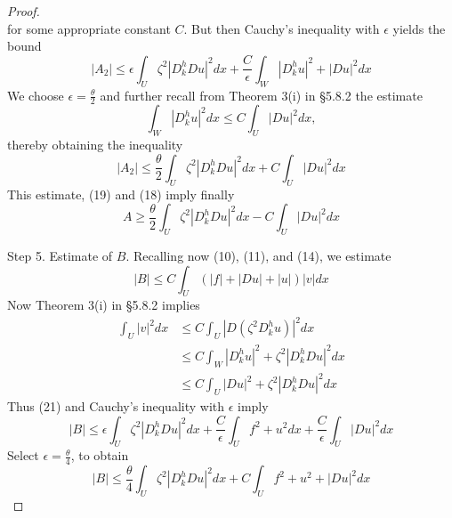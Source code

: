 \begin{theorem}
\begin{proof}
\begin{equation*}
        \end{equation*}
        for some appropriate constant $C$. But then Cauchy's inequality with $\epsilon$  yields the bound
        \begin{equation*}
            \left|A_2\right|
            \leq
            \epsilon \int_U \zeta^2\left|D_k^h D u\right|^2 d x+\frac{C}{\epsilon} \int_W\left|D_k^h u\right|^2+|D u|^2 d x
        \end{equation*}
        We choose $\epsilon=\frac{\theta}{2}$ and further recall from Theorem 3(i) in §5.8.2 the estimate
        \begin{equation*}
            \int_W\left|D_k^h u\right|^2 d x \leq C \int_U|D u|^2 d x,
        \end{equation*}
        thereby obtaining the inequality
        \begin{equation}
            \left|A_2\right|
            \leq
            \frac{\theta}{2} \int_U \zeta^2\left|D_k^h D u\right|^2 d x+C \int_U|D u|^2 d x
        \end{equation}
        This estimate, (19) and (18) imply finally
        \begin{equation*}
            A \geq \frac{\theta}{2} \int_U \zeta^2\left|D_k^h D u\right|^2 d x-C \int_U|D u|^2 d x
        \end{equation*}

        Step 5.
        Estimate of $B$. Recalling now (10), (11), and (14), we estimate
        \begin{equation*}
            |B| \leq C \int_U(|f|+|D u|+|u|)|v| d x
        \end{equation*}
        Now Theorem 3(i) in §5.8.2 implies
        \begin{equation*}
            \begin{aligned}
                \int_U|v|^2 d x & \leq C \int_U\left|D\left(\zeta^2 D_k^h u\right)\right|^2 d x           \\
                                & \leq C \int_W\left|D_k^h u\right|^2+\zeta^2\left|D_k^h D u\right|^2 d x \\
                                & \leq C \int_U|D u|^2+\zeta^2\left|D_k^h D u\right|^2 d x
            \end{aligned}
        \end{equation*}
        Thus (21) and Cauchy's inequality with $\epsilon$ imply
        \begin{equation*}
            |B| \leq \epsilon \int_U \zeta^2\left|D_k^h D u\right|^2 d x+\frac{C}{\epsilon} \int_U f^2+u^2 d x+\frac{C}{\epsilon} \int_U|D u|^2 d x
        \end{equation*}
        Select $\epsilon=\frac{\theta}{4}$, to obtain
        \begin{equation*}
            |B| \leq \frac{\theta}{4} \int_U \zeta^2\left|D_k^h D u\right|^2 d x+C \int_U f^2+u^2+|D u|^2 d x
        \end{equation*}


\end{proof}
\end{theorem}
